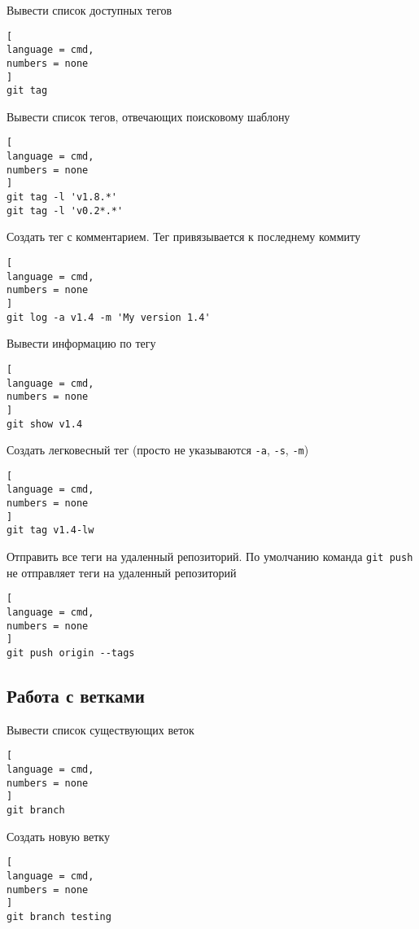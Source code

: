 \documentclass[%
	11pt,
	a4paper,
	utf8,
		]{article}
\begin{document}
Вывести список доступных тегов

\begin{lstlisting}[
language = cmd,
numbers = none
]
git tag
\end{lstlisting}


Вывести список тегов, отвечающих поисковому  шаблону

\begin{lstlisting}[
language = cmd,
numbers = none
]
git tag -l 'v1.8.*'
git tag -l 'v0.2*.*'
\end{lstlisting}


Создать тег с комментарием. Тег привязывается к последнему коммиту

\begin{lstlisting}[
language = cmd,
numbers = none
]
git log -a v1.4 -m 'My version 1.4'
\end{lstlisting}

Вывести информацию по тегу

\begin{lstlisting}[
language = cmd,
numbers = none
]
git show v1.4
\end{lstlisting}


Создать легковесный тег (просто не указываются \texttt{-a}, \texttt{-s}, \texttt{-m})

\begin{lstlisting}[
language = cmd,
numbers = none
]
git tag v1.4-lw
\end{lstlisting}


Отправить все теги на удаленный репозиторий. По умолчанию команда \texttt{git push} не отправляет теги на удаленный репозиторий

\begin{lstlisting}[
language = cmd,
numbers = none
]
git push origin --tags
\end{lstlisting}


\subsection{Работа с ветками}

Вывести список существующих веток

\begin{lstlisting}[
language = cmd,
numbers = none
]
git branch
\end{lstlisting}


Создать новую ветку

\begin{lstlisting}[
language = cmd,
numbers = none
]
git branch testing
\end{lstlisting}
\end{document}

